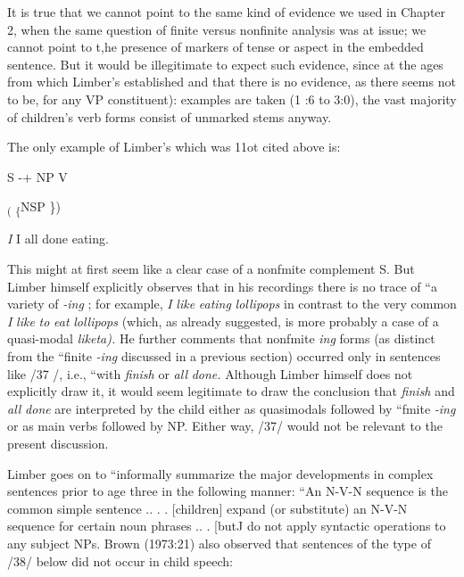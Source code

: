It is true that we cannot point to the same kind of evidence
we used in Chapter 2, when the same question of finite versus non\-finite analysis was at issue; we cannot point to t,he presence of markers of tense or aspect in the embedded sentence. But it would be illegiti\-mate to expect such evidence, since at the ages from which Limber's
established and that there is no evidence, as there seems not to be, for any VP constituent):
examples are taken (1 :6 to 3:0), the vast majority of children's verb forms consist of unmarked stems anyway.

The only example of Limber's which was 11ot cited above is:

\ea\label{ex:39}
 S {}-+ NP V
\glt
\z

\textsubscript{( }\textsubscript{\{}NSP \})

\ea\label{ex:37}
\textit{I} I all done eating.
\glt
\z

This might at first seem like a clear case of a nonf{\textquotedbl}mite complement S. But Limber himself explicitly observes that in his recordings there is no trace of ``a variety of \textit{{}-ing} ; for example, \textit{I} \textit{like} \textit{eating} \textit{lollipops} in contrast to the very common \textit{I} \textit{like} \textit{to} \textit{eat} \textit{lollipops{\textquotedbl}} (which, as already suggested, is more probably a case of a quasi-modal \textit{liketa).} He further comments that nonf{\textquotedbl}mite \textit{i}\textit{n}\textit{g} forms (as distinct from the ``finite \textit{{}-ing{\textquotedbl}} discussed in a previous section) occurred only in sentences like /37 /, i.e., ``with \textit{finish} or \textit{all} \textit{d}\textit{one.{\textquotedbl}} Although Limber himself does not explicitly draw it, it would seem legitimate to draw the conclusion that \textit{finish} and \textit{all} \textit{done} are interpreted by the child either as quasi\-modals followed by ``fmite \textit{{}-i}\textit{n}\textit{g{\textquotedbl}} or as main verbs followed by NP. Either way, /37/ would not be relevant to the present discussion.

Limber goes on to ``informally summarize the major develop\-ments in complex sentences prior to age three in the following manner: ``An N-V-N sequence is the common simple sentence .. . . [children] expand (or substitute) an N-V-N sequence for certain noun phrases .. .
[butJ do not apply syntactic operations to any subject NPs. Brown (1973:21) also observed that sentences of the type of /38/ below did not occur in child speech:

